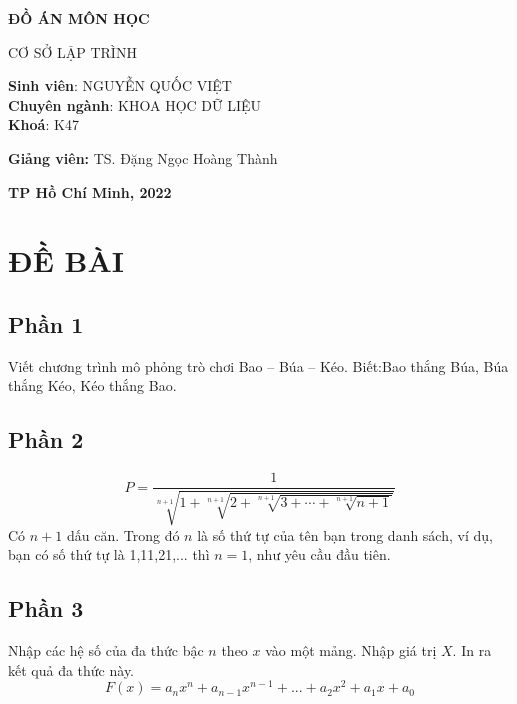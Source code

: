 \documentclass[a4paper]{article}
\begin{document}
\begin{titlepage}
\begin{center}
    \vspace{20pt}
    \fontsize{14pt}{13pt}\selectfont 
    \textbf{ĐỒ ÁN MÔN HỌC} 
    
    \vspace{7pt}
    {CƠ SỞ LẬP TRÌNH}
\end{center}

\vspace{3cm}
\large
\begin{center}
    \textbf{Sinh viên}: NGUYỄN QUỐC VIỆT\\
    \vspace{7pt}
    \textbf{Chuyên ngành}: KHOA HỌC DỮ LIỆU\\
    \vspace{7pt}
    \textbf{Khoá}: K47
\end{center}

\vspace{2cm}
\large
\begin{center}
    \textbf{Giảng viên:} TS. Đặng Ngọc Hoàng Thành
\end{center}
\vfill
\large
\begin{center}
    \textbf{TP Hồ Chí Minh, 2022}
\end{center}
\end{titlepage}

\large
\tableofcontents
\vfill

\section{ĐỀ BÀI}
\subsection{Phần 1}
Viết chương trình mô phỏng trò chơi Bao – Búa – Kéo. Biết:Bao thắng  Búa, Búa thắng Kéo, Kéo thắng Bao.

\subsection{Phần 2} 
$$
P=\frac{1}{\sqrt[n+1]{1+\sqrt[n+1]{2+\sqrt[n+1]{3+\cdots+\sqrt[n+1]{n+1}}}}}
$$
Có $n+1$ dấu căn. Trong đó $n$ là số thứ tự của tên bạn trong danh sách, ví dụ, bạn có số thứ tự là 1,11,21,... thì $n=1$, như yêu cầu đầu tiên.\\

\subsection{Phần 3}
Nhập các hệ số của đa thức bậc $n$ theo $x$ vào một mảng. Nhập giá trị $X$. In ra kết quả đa thức này.
$$
F(x) = a_{n}x^{n} + a_{n-1}x^{n-1} + ... + a_{2}x^{2} + a_{1}x + a_{0}
$$
\end{document}
